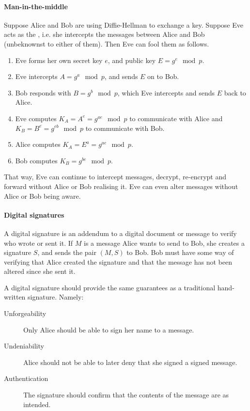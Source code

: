 \documentclass[a4paper, 11pt, openany]{book}
\begin{document}
\paragraph{Man-in-the-middle}

Suppose Alice and Bob are using Diffie-Hellman to exchange a key. Suppose Eve acts as the , i.e. she intercepts the messages between Alice and Bob (unbeknownst to either of them). Then Eve can fool them as follows.
\begin{enumerate}
    \item Eve forms her own secret key $e$, and public key $E = g^e \mod p$.

    \item Eve intercepts $A = g^a \mod p$, and sends $E$ on to Bob.

    \item Bob responds with $B = g^b \mod p$, which Eve intercepts and sends $E$ back to Alice.

    \item Eve computes $K_A = A^e = g^{ae} \mod p$ to communicate with Alice and $K_B = B^e = g^{eb} \mod p$ to communicate with Bob.

    \item Alice computes $K_A = E^a = g^{ae} \mod p$.

    \item Bob computes $K_B = g^{be} \mod p$.
\end{enumerate}
That way, Eve can continue to intercept messages, decrypt, re-encrypt and forward without Alice or Bob realising it. Eve can even alter messages without Alice or Bob being aware.



\paragraph{Digital signatures}

A digital signature is an addendum to a digital document or message to verify who wrote or sent it. If $M$ is a message Alice wants to send to Bob, she creates a signature $S$, and sends the pair $(M,S)$ to Bob. Bob must have some way of verifying that Alice created the signature and that the message has not been altered since she sent it.

A digital signature should provide the same guarantees as a traditional hand-written signature. Namely:
\begin{description}
\item[Unforgeability] Only Alice should be able to sign her name to a message.

\item[Undeniability] Alice should not be able to later deny that she signed a signed message.

\item[Authentication] The signature should confirm that the contents of the message are as intended.
\end{description}
\end{document}
